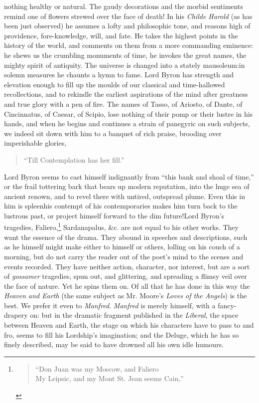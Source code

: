 nothing healthy or natural. The gaudy decorations and the morbid
sentiments remind one of flowers strewed over the face of death! In
his \emph{Childe Harold} (as has been just observed) he assumes a lofty and
philosophic tone, and reasons high of providence, fore-knowledge, will,
and fate. He takes the highest points in the history of the world,
and comments on them from a more commanding eminence: he shews us the
crumbling monuments of time, he invokes the great names, the
mighty spirit of antiquity. The universe is changed into a stately
mausoleum:\textemdash in solemn measures he chaunts a hymn to fame. Lord Byron has
strength and elevation enough to fill up the moulds of our classical and
time-hallowed recollections, and to rekindle the earliest aspirations of
the mind after greatness and true glory with a pen of fire. The names of
Tasso, of Ariosto, of Dante, of Cincinnatus, of Caesar, of Scipio, lose
nothing of their pomp or their lustre in his hands, and when he begins
and continues a strain of panegyric on such subjects, we indeed sit
down with him to a banquet of rich praise, brooding over imperishable
glories,
\begin{quote}
  ``Till Contemplation has her fill.''

\end{quote}
Lord Byron seems to cast himself indignantly from ``this bank and shoal
of time,'' or the frail tottering bark that bears up modern reputation,
into the huge sea of ancient renown, and to revel there with untired,
outspread plume. Even this in him is spleen\textemdash his contempt of his
contemporaries makes him turn back to the lustrous past, or project
himself forward to the dim future!\textemdash Lord Byron's
tragedies, Faliero,\footnote{
  \begin{quote}
    ``Don Juan was my Moscow, and Faliero \\
    My Leipsic, and my Mont St. Jean seems Cain,'' \\
\end{quote} 
}
Sardanapalus, \&c. are not equal to his other works. They want the
essence of the drama. They abound in speeches and descriptions, such as
he himself might make either to himself or others, lolling on his couch
of a morning, but do not carry the reader out of the poet's mind to the
scenes and events recorded. They have neither action, character,
nor interest, but are a sort of \emph{gossamer} tragedies, spun out, and
glittering, and spreading a flimsy veil over the face of nature. Yet
he spins them on. Of all that he has done in this way the \emph{Heaven and
Earth} (the same subject as Mr. Moore's \emph{Loves of the Angels}) is the
best. We prefer it even to \emph{Manfred}. \emph{Manfred} is merely himself,
with a fancy-drapery on: but in the dramatic fragment published in the
\emph{Liberal}, the space between Heaven and Earth, the stage on which
his characters have to pass to and fro, seems to fill his Lordship's
imagination; and the Deluge, which he has so finely described, may be
said to have drowned all his own idle humours.


